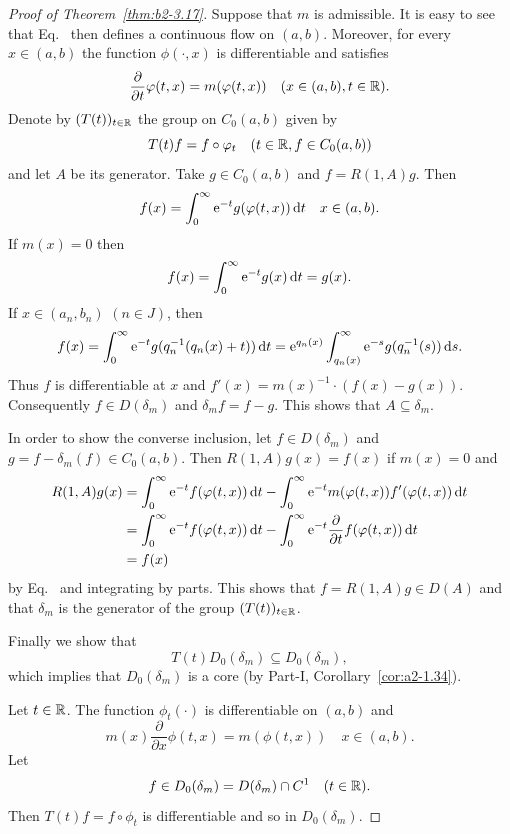 \begin{proof}[Proof of Theorem~\ref{thm:b2-3.17}]
Suppose that $m$ is admissible.
It is easy to see that Eq.~ then defines a continuous flow on $(a,b)$.
Moreover, for every $x \in (a,b)$ the function $\phi(\cdot,x)$ is differentiable and satisfies
\begin{equation}\label{eq:b2-3.23}
\frac{\partial}{\partial t}\phi(t,x) = m(\phi(t,x)) \quad (x \in (a,b), t \in \R).
\end{equation}
Denote by $(T(t))_{t \in \mathbb{R}}$ the group on $C_{0}(a,b)$ given by 
%
\[
	T(t)f = f \circ \phi_{t} \quad (t \in \R, f \in C_{0}(a,b)) 
\]
%
and let $A$ be its generator.
Take $g \in C_{0}(a,b)$ and $f = R(1,A)g$.
Then %
\[
	f(x) = \int_{0}^{\infty} \eu^{-t}g(\phi(t,x)) \dt \quad x \in (a,b).
\]
%
If\/ $m(x) = 0$ then 
%
\[
	f(x) = \int_{0}^{\infty} \mathrm{e}^{-t}g(x) \mathop{}\!\mathrm{d}{t} = g(x) .
\]
%
If\/ $x \in (a_{n},b_{n})$ $(n \in J)$, then 
\[
f(x) = \int_{0}^{\infty} \mathrm{e}^{-t}g(q_{n}^{-1}(q_{n}(x) + t)) \mathop{}\!\mathrm{d}{t} = \mathrm{e}^{q_{n}(x)} \int_{q_{n}(x)}^{\infty} \mathrm{e}^{-s}g(q_{n}^{-1}(s)) \mathop{}\!\mathrm{d}{s}.
\]
Thus $f$ is differentiable at $x$ and $f'(x) = m(x)^{-1} \cdot (f(x) - g(x))$.
Consequently $f \in D(\delta_{m})$ and $\delta_{m}f = f - g$.
This shows that $A \subseteq \delta_{m}$.

In order to show the converse inclusion, let $f \in D(\delta_{m})$ and $g = f - \delta_{m}(f) \in C_{0}(a,b)$.
Then $R(1,A)g(x) = f(x)$ if\/ $m(x) = 0$ and 
\begin{align*}
R(1,A)g(x) &= \int_{0}^{\infty} \eu^{-t}f(\phi(t,x)) \dt - \int_{0}^{\infty} \eu^{-t}m(\phi(t,x))f'(\phi(t,x)) \dt \\
           &= \int_{0}^{\infty} \eu^{-t}f(\phi(t,x)) \dt - \int_{0}^{\infty} \eu^{-t}\frac{\partial}{\partial t}f(\phi(t,x)) \dt 
           \\
           &= f(x) 
\end{align*}
by  Eq.~ and integrating by parts.
This shows that $f = R(1,A)g \in D(A)$ and that $\delta_{m}$ is the generator of the group $(T(t))_{t \in \mathbb{R}}$.

Finally we show that 
%
\[
	T(t)D_{0}(\delta_{m}) \subseteq D_{0}(\delta_{m}),
\]
%
which implies that $D_{0}(\delta_{m})$ is a core (by Part-I, Corollary~\ref{cor:a2-1.34}).

Let $t \in \mathbb{R}$.
The function $\phi_{t}(\cdot)$ is
differentiable on $(a,b)$ and 
%
\[
	m(x)\frac{\partial}{\partial x}\phi(t,x) = m(\phi(t,x)) \quad x \in (a,b) .
\]
%
Let 
%
\[
	f \in D_{0}(\delta_{m}) = D(\delta_{m}) \cap C^{1} \quad (t \in \mathbb{R}) .
\]
%
Then $T(t)f = f \circ \phi_{t}$ is differentiable and so in $D_{0}(\delta_{m})$.


\end{proof}
